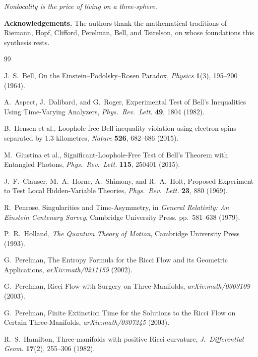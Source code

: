 \documentclass[12pt,a4paper]{article}
\theoremstyle{definition}
\theoremstyle{remark}
\begin{document}
\bigskip
\begin{center}
\textit{Nonlocality is the price of living on a three-sphere.}
\end{center}

\bigskip
\noindent\textbf{Acknowledgements.} The authors thank the mathematical traditions of
Riemann, Hopf, Clifford, Perelman, Bell, and Tsirelson, on whose foundations this
synthesis rests.

\begin{thebibliography}{99}

J.~S.~Bell, On the Einstein--Podolsky--Rosen Paradox,
\textit{Physics} \textbf{1}(3), 195--200 (1964).

A.~Aspect, J.~Dalibard, and G.~Roger,
Experimental Test of Bell's Inequalities Using Time-Varying Analyzers,
\textit{Phys.\ Rev.\ Lett.} \textbf{49}, 1804 (1982).

B.~Hensen et al., Loophole-free Bell inequality violation using electron spins
separated by 1.3 kilometres, \textit{Nature} \textbf{526}, 682--686 (2015).

M.~Giustina et al., Significant-Loophole-Free Test of Bell's Theorem with
Entangled Photons, \textit{Phys.\ Rev.\ Lett.} \textbf{115}, 250401 (2015).

J.~F.~Clauser, M.~A.~Horne, A.~Shimony, and R.~A.~Holt, Proposed Experiment to
Test Local Hidden-Variable Theories,
\textit{Phys.\ Rev.\ Lett.} \textbf{23}, 880 (1969).

R.~Penrose, Singularities and Time-Asymmetry, in \textit{General Relativity: An
Einstein Centenary Survey}, Cambridge University Press, pp.~581--638 (1979).

P.~R.~Holland, \textit{The Quantum Theory of Motion}, Cambridge University Press
(1993).

G.~Perelman, The Entropy Formula for the Ricci Flow and its Geometric Applications,
\textit{arXiv:math/0211159} (2002).

G.~Perelman, Ricci Flow with Surgery on Three-Manifolds,
\textit{arXiv:math/0303109} (2003).

G.~Perelman, Finite Extinction Time for the Solutions to the Ricci Flow on Certain
Three-Manifolds, \textit{arXiv:math/0307245} (2003).

R.~S.~Hamilton, Three-manifolds with positive Ricci curvature,
\textit{J.~Differential Geom.} \textbf{17}(2), 255--306 (1982).


\end{thebibliography}
\end{document}
